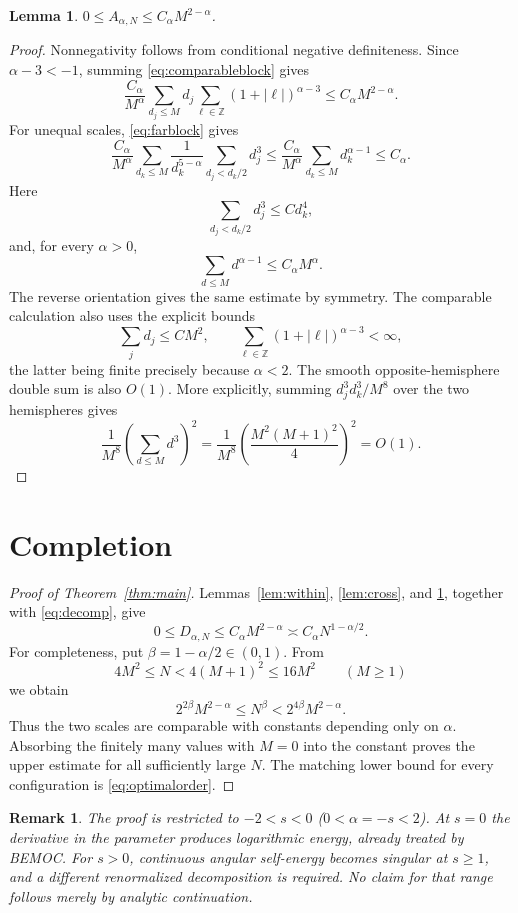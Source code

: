 \documentclass[11pt]{amsart}
\newtheorem{lemma}[theorem]{Lemma}
\newtheorem{remark}[theorem]{Remark}
\begin{document}
\begin{lemma}\label{lem:latitude}
$0\le A_{\alpha,N}\le C_\alpha M^{2-\alpha}$.
\end{lemma}

\begin{proof}
Nonnegativity follows from conditional negative definiteness.  Since
$\alpha-3<-1$, summing \eqref{eq:comparableblock} gives
\[
 \frac{C_\alpha}{M^\alpha}
 \sum_{d_j\le M}d_j
 \sum_{\ell\in\mathbb Z}(1+|\ell|)^{\alpha-3}
 \le C_\alpha M^{2-\alpha}.
\]
For unequal scales, \eqref{eq:farblock} gives
\[
 \frac{C_\alpha}{M^\alpha}
 \sum_{d_k\le M}\frac1{d_k^{5-\alpha}}
 \sum_{d_j<d_k/2}d_j^3
 \le\frac{C_\alpha}{M^\alpha}
 \sum_{d_k\le M}d_k^{\alpha-1}\le C_\alpha.
\]
Here
\[
 \sum_{d_j<d_k/2}d_j^3\le C d_k^4,
\]
and, for every $\alpha>0$,
\[
 \sum_{d\le M}d^{\alpha-1}\le C_\alpha M^\alpha.
\]
The reverse orientation gives the same estimate by symmetry.  The
comparable calculation also uses the explicit bounds
\[
 \sum_jd_j\le CM^2,\qquad
 \sum_{\ell\in\mathbb Z}(1+|\ell|)^{\alpha-3}<\infty,
\]
the latter being finite precisely because $\alpha<2$.
The smooth opposite-hemisphere double sum is also $O(1)$.
More explicitly, summing $d_j^3d_k^3/M^8$ over the two hemispheres gives
\[
 \frac1{M^8}
 \left(\sum_{d\le M}d^3\right)^2
 =\frac1{M^8}
 \left(\frac{M^2(M+1)^2}{4}\right)^2
 =O(1).
\]
\end{proof}

\section{Completion}

\begin{proof}[Proof of Theorem~\ref{thm:main}]
Lemmas~\ref{lem:within}, \ref{lem:cross}, and \ref{lem:latitude}, together
with \eqref{eq:decomp}, give
\[
 0\le D_{\alpha,N}\le C_\alpha M^{2-\alpha}
 \asymp C_\alpha N^{1-\alpha/2}.
\]
For completeness, put $\beta=1-\alpha/2\in(0,1)$.  From
\[
 4M^2\le N<4(M+1)^2\le16M^2\qquad(M\ge1)
\]
we obtain
\[
 2^{2\beta}M^{2-\alpha}
 \le N^\beta
 <2^{4\beta}M^{2-\alpha}.
\]
Thus the two scales are comparable with constants depending only on
$\alpha$.  Absorbing the finitely many values with $M=0$ into the constant
proves the upper estimate for all sufficiently large $N$.
The matching lower bound for every configuration is \eqref{eq:optimalorder}.
\end{proof}

\begin{remark}
The proof is restricted to $-2<s<0$ ($0<\alpha=-s<2$).  At $s=0$ the
derivative in the parameter produces logarithmic energy, already treated by
BEMOC.  For $s>0$, continuous angular self-energy becomes singular at
$s\ge1$, and a different renormalized decomposition is required.  No claim
for that range follows merely by analytic continuation.
\end{remark}
\end{document}
